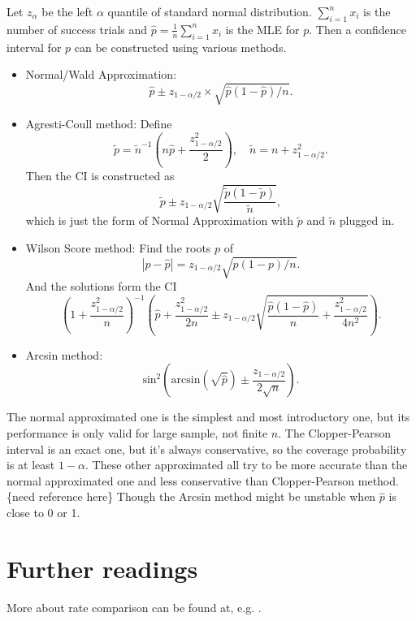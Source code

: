 \documentclass[a4paper,12pt]{article}
\begin{document}
Let $z_\alpha$ be the left $\alpha$ quantile of standard normal distribution. $\sum\limits_{i = 1}^nx_i$ is the number of success trials and $\hat{p} = \frac{1}{n}\sum\limits_{i = 1}^nx_i$ is the MLE for $p$. Then a confidence interval for $p$ can be constructed using various methods.
\begin{itemize}
\item Normal/Wald Approximation:
  \[
    \hat{p} \pm z_{1 - \alpha / 2}\times \sqrt{\hat{p}\left(1 - \hat{p}\right) / n}
    .
  \]
\item Agresti-Coull method: Define
  \[
    \tilde{p} = \tilde{n}^{-1}
    \left(
      n\hat{p} + \frac{z_{1 - \alpha / 2}^2}{2}
    \right)
    ,\quad
    \tilde{n} = n + z^2_{1 - \alpha / 2}
    .
  \]
  Then the CI is constructed as
  \[
    \tilde{p} \pm z_{1 - \alpha / 2}\sqrt{
      \frac{\tilde{p}\left(1 - \tilde{p}\right)}{\tilde{n}}
    }
    ,
  \]
  which is just the form of Normal Approximation with $\tilde{p}$ and $\tilde{n}$ plugged in.
\item Wilson Score method: Find the roots $p$ of
  \[
    \left|p - \hat{p}\right|
    = z_{1 - \alpha / 2}\sqrt{p\left(1 - p\right) / n}
    .
  \]
  And the solutions form the CI
  \[
    \left(1 + \frac{z_{1 - \alpha / 2}^2}{n}\right)^{-1}
    \left(
      \hat{p} + \frac{z_{1 - \alpha / 2}^2}{2n}
      \pm
      z_{1 - \alpha / 2}\sqrt{
        \frac{\hat{p}\left(1 - \hat{p}\right)}{n}
        + \frac{z_{1 - \alpha / 2}^2}{4n^2}
      }
    \right)
    .
  \]
\item Arcsin method:
  \[
    \mathrm{sin}^2\left(
      \mathrm{arcsin}\left(\sqrt{\hat{p}}\right) \pm \frac{z_{1 - \alpha / 2}}{2\sqrt{n}}
    \right)
    .
  \]
\end{itemize}

The normal approximated one is the simplest and most introductory one, but its performance is only valid for large sample, not finite $n$. The Clopper-Pearson interval is an exact one, but it's always conservative, so the coverage probability is at least $1 - \alpha$. These other approximated all try to be more accurate than the normal approximated one and less conservative than Clopper-Pearson method. {\color{blue}\{need reference here\} Though the Arcsin method might be unstable when $\hat{p}$ is close to 0 or 1.}


\section{Further readings}
\label{sec:further-readings}

More about rate comparison can be found at, e.g. \citet{Miettinen1985p213-226, Lui2004p1283-1296, Fagerland2014p2850-2875, Chan1999p1202-1209}.



\end{document}
